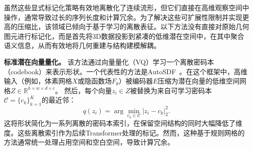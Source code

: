 \documentclass[../../book-main_zh.tex]{subfiles}
\begin{document}
\begin{itemize}

\end{itemize}

虽然这些显式标记化策略有效地离散化了连续流形，但它们直接在高维观察空间中操作，通常导致过长的序列长度和计算冗余。为了解决这些可扩展性限制并实现更高的压缩比，该领域已倾向于基于学习的离散表征。以下方法没有直接对原始几何图元进行标记化，而是首先将3D数据投影到紧凑的低维潜在空间中，在其中聚合语义信息，从而有效地将几何重建与结构建模解耦。

\textbf{标准潜在向量量化。} 该方法通过向量量化（VQ）学习一个离散密码本（codebook）来表示形状。一个代表性的方法是AutoSDF~\cite{mittal2022autosdf}。在这个框架中，高维输入（例如，体素网格$X$或隐函数场$F_\theta$）被编码器$E$压缩为潜在向量的低维空间网格$Z \in \mathbb{R}^{h \times w \times d \times c}$。
然后，每个向量$z_i \in Z$被替换为来自可学习密码本$\mathcal{C}=\{c_k\}_{k=1}^K$的最近邻：
\begin{equation}
q(z_i) = \arg\min_{c_k \in \mathcal{C}} | z_i - c_k |_2^2.
\end{equation}
这将形状简化为一系列离散的密码本索引，在保留空间结构的同时大幅降低了维度。这些离散索引作为后续Transformer处理的标记。然而，这种基于规则网格的方法通常统一处理占用空间和空白空间，导致计算冗余。

\end{document}
